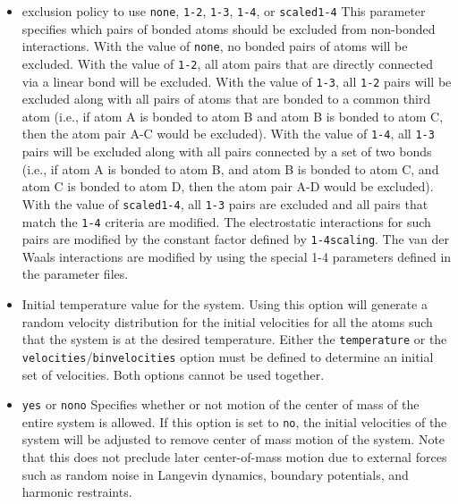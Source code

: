 \begin{itemize}
\item
{}
{exclusion policy to use}
{{\tt none}, {\tt 1-2}, {\tt 1-3}, {\tt 1-4}, or {\tt scaled1-4}}
{\label{param:exclude}
This parameter specifies which pairs of bonded atoms should
be excluded from non-bonded
interactions.  With the value of {\tt none}, no bonded pairs of atoms 
will be excluded.  With the value of {\tt 1-2}, all atom pairs that
are directly connected via a linear bond will be excluded.  With the
value of {\tt 1-3}, all {\tt 1-2} pairs will be excluded along with
all pairs of atoms that are bonded to a common
third atom (i.e., if atom A is bonded to atom B and atom B is bonded
to atom C, then the atom pair A-C would be excluded).
With the value of {\tt 1-4}, all {\tt 1-3} pairs will be excluded along
with all pairs connected by a set of two bonds (i.e., if atom A is bonded
to atom B, and atom B is bonded to atom C, and atom C is bonded to
atom D, then the atom pair A-D would be excluded).  With the value
of {\tt scaled1-4}, all {\tt 1-3} pairs are excluded and all pairs
that match the {\tt 1-4} criteria are modified.  The electrostatic
interactions for such pairs are modified by the constant factor
defined by {\tt 1-4scaling}.  
The van der Waals interactions are modified
by using the special 1-4 parameters defined in the parameter files.}

\item
{}
{\label{param:temperature}
Initial temperature value for the system.  
Using this option will generate a random
velocity distribution for the initial velocities 
for all the atoms such that the system 
is at the desired temperature.  
Either the {\tt temperature} 
or the {\tt velocities}/{\tt binvelocities}
option must be defined to determine an initial set of velocities.  
Both options cannot be used together.}

\item
{}
{{\tt yes} or {\tt no}}{{\tt no}}
{
Specifies whether or not motion of 
the center of mass of the entire system is allowed.  
If this option is set to {\tt no}, the initial velocities of the system 
will be adjusted to remove center of mass motion of the system.
Note that this does not preclude later center-of-mass motion due to 
external forces such as random noise in Langevin dynamics, boundary
potentials, and harmonic restraints.}


\end{itemize}
